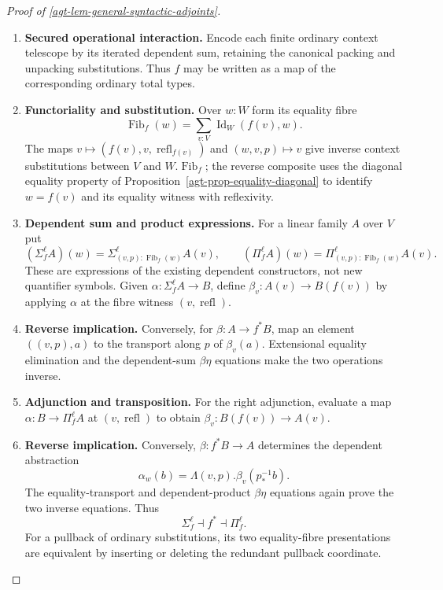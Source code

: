 \documentclass[11pt,a4paper]{article}
\numberwithin{equation}{section}
\theoremstyle{definition}
\theoremstyle{remark}
\theoremstyle{plain}
\begin{document}
\begin{proof}[Proof of \cref{agt-lem-general-syntactic-adjoints}]
\leavevmode
\begin{enumerate}[label=\textup{(\arabic*)},leftmargin=*,itemsep=4pt,topsep=3pt]
  \item \textbf{Secured operational interaction.} Encode each finite ordinary context telescope by its iterated dependent
sum, retaining the canonical packing and unpacking substitutions. Thus
$f$ may be written as a map of the corresponding ordinary total types.
  \item \textbf{Functoriality and substitution.} Over $w:W$ form its equality fibre
\[
 \operatorname{Fib}_f(w)
 =\sum_{v:V}\operatorname{Id}_W(f(v),w).
\]
The maps
$v\mapsto(f(v),v,\operatorname{refl}_{f(v)})$ and
$(w,v,p)\mapsto v$ give inverse context substitutions between $V$
and $W.\operatorname{Fib}_f$; the reverse composite uses the diagonal equality property of
Proposition~\ref{agt-prop-equality-diagonal} to identify $w=f(v)$
and its equality witness with reflexivity.
  \item \textbf{Dependent sum and product expressions.} For a linear family $A$ over
$V$ put
\[
 (\Sigma_f^\ell A)(w)
 =\Sigma^\ell_{(v,p):\operatorname{Fib}_f(w)}A(v),\qquad
 (\Pi_f^\ell A)(w)
 =\Pi^\ell_{(v,p):\operatorname{Fib}_f(w)}A(v).
\]
These are expressions of the existing dependent constructors, not new
quantifier symbols. Given $\alpha:\Sigma_f^\ell A\to B$, define
$\beta_v:A(v)\to B(f(v))$ by applying $\alpha$ at the fibre witness
$(v,\operatorname{refl})$.
  \item \textbf{Reverse implication.} Conversely, for $\beta:A\to f^*B$,
map an element $((v,p),a)$ to the transport along $p$ of
$\beta_v(a)$. Extensional equality elimination and the dependent-sum
$\beta\eta$ equations make the two operations inverse.
  \item \textbf{Adjunction and transposition.} For the right adjunction, evaluate a map
$\alpha:B\to\Pi_f^\ell A$ at $(v,\operatorname{refl})$ to obtain
$\beta_v:B(f(v))\to A(v)$.
  \item \textbf{Reverse implication.} Conversely, $\beta:f^*B\to A$
determines the dependent abstraction
\[
 \alpha_w(b)=\Lambda(v,p).\beta_v(p^{-1}_*b).
\]
The equality-transport and dependent-product $\beta\eta$ equations again
prove the two inverse equations. Thus
\[
 \Sigma_f^\ell\dashv f^*\dashv\Pi_f^\ell.
\]
For a pullback of ordinary substitutions, its two equality-fibre
presentations are equivalent by inserting or deleting the redundant
pullback coordinate.

\end{enumerate}
\end{proof}
\end{document}
